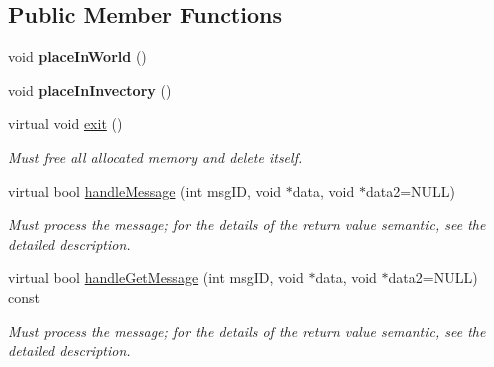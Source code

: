 \subsection*{\-Public \-Member \-Functions}
\begin{DoxyCompactItemize}
\item 
\hypertarget{classComponentWeapon_a447cd283b09cf3a6d32cfe6163bc685e}{
void {\bfseries place\-In\-World} ()}
\label{de/df8/classComponentWeapon_a447cd283b09cf3a6d32cfe6163bc685e}

\item 
\hypertarget{classComponentWeapon_a0125f5accb3f47e0a96385c4098d5b89}{
void {\bfseries place\-In\-Invectory} ()}
\label{de/df8/classComponentWeapon_a0125f5accb3f47e0a96385c4098d5b89}

\item 
\hypertarget{classComponentWeapon_a339e6ffc6e33c8853672f46a7f4a5aa2}{
virtual void \hyperlink{classComponentWeapon_a339e6ffc6e33c8853672f46a7f4a5aa2}{exit} ()}
\label{de/df8/classComponentWeapon_a339e6ffc6e33c8853672f46a7f4a5aa2}

\begin{DoxyCompactList}\small\item\em \-Must free all allocated memory and delete itself. \end{DoxyCompactList}\item 
virtual bool \hyperlink{classComponentWeapon_a4392a86c64f4334559d0692b54595b0c}{handle\-Message} (int msg\-I\-D, void $\ast$data, void $\ast$data2=\-N\-U\-L\-L)
\begin{DoxyCompactList}\small\item\em \-Must process the message; for the details of the return value semantic, see the detailed description. \end{DoxyCompactList}\item 
virtual bool \hyperlink{classComponentWeapon_a487f0d3fe05e8f8dec2f672739f6a87d}{handle\-Get\-Message} (int msg\-I\-D, void $\ast$data, void $\ast$data2=\-N\-U\-L\-L) const 
\begin{DoxyCompactList}\small\item\em \-Must process the message; for the details of the return value semantic, see the detailed description. \end{DoxyCompactList}\end{DoxyCompactItemize}
